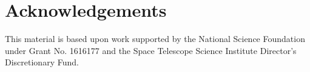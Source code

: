 \section{Acknowledgements}

This material is based upon work supported by the National Science Foundation under Grant No. 1616177 and the Space Telescope Science Institute Director's Discretionary Fund.

